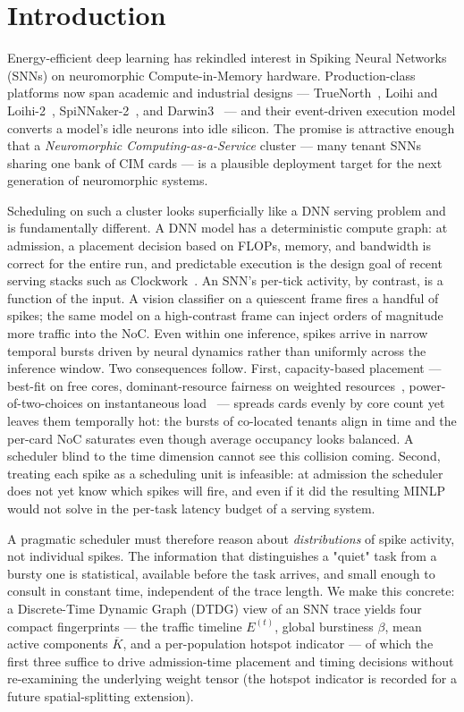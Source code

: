 \documentclass[letterpaper,twocolumn,10pt]{article}
\begin{document}
\section{Introduction}
\label{sec:intro}

Energy-efficient deep learning has rekindled interest in Spiking Neural Networks (SNNs) on neuromorphic Compute-in-Memory hardware. Production-class platforms now span academic and industrial designs --- TrueNorth~\cite{merolla2014truenorth}, Loihi and Loihi-2~\cite{davies2018loihi, orchard2021loihi2}, SpiNNaker-2~\cite{mayr2019spinnaker2}, and Darwin3~\cite{ma2024darwin3} --- and their event-driven execution model converts a model's idle neurons into idle silicon. The promise is attractive enough that a \emph{Neuromorphic Computing-as-a-Service} cluster --- many tenant SNNs sharing one bank of CIM cards --- is a plausible deployment target for the next generation of neuromorphic systems.

Scheduling on such a cluster looks superficially like a DNN serving problem and is fundamentally different. A DNN model has a deterministic compute graph: at admission, a placement decision based on FLOPs, memory, and bandwidth is correct for the entire run, and predictable execution is the design goal of recent serving stacks such as Clockwork~\cite{gujarati2020clockwork}. An SNN's per-tick activity, by contrast, is a function of the input. A vision classifier on a quiescent frame fires a handful of spikes; the same model on a high-contrast frame can inject orders of magnitude more traffic into the NoC. Even within one inference, spikes arrive in narrow temporal bursts driven by neural dynamics rather than uniformly across the inference window. Two consequences follow. First, capacity-based placement --- best-fit on free cores, dominant-resource fairness on weighted resources~\cite{ghodsi2011dominant}, power-of-two-choices on instantaneous load~\cite{mohan2022looking} --- spreads cards evenly by core count yet leaves them temporally hot: the bursts of co-located tenants align in time and the per-card NoC saturates even though average occupancy looks balanced. A scheduler blind to the time dimension cannot see this collision coming. Second, treating each spike as a scheduling unit is infeasible: at admission the scheduler does not yet know which spikes will fire, and even if it did the resulting MINLP would not solve in the per-task latency budget of a serving system.

A pragmatic scheduler must therefore reason about \emph{distributions} of spike activity, not individual spikes. The information that distinguishes a "quiet" task from a bursty one is statistical, available before the task arrives, and small enough to consult in constant time, independent of the trace length. We make this concrete: a Discrete-Time Dynamic Graph (DTDG) view of an SNN trace yields four compact fingerprints --- the traffic timeline $E^{(t)}$, global burstiness $\beta$, mean active components $\overline{K}$, and a per-population hotspot indicator --- of which the first three suffice to drive admission-time placement and timing decisions without re-examining the underlying weight tensor (the hotspot indicator is recorded for a future spatial-splitting extension).
\end{document}
